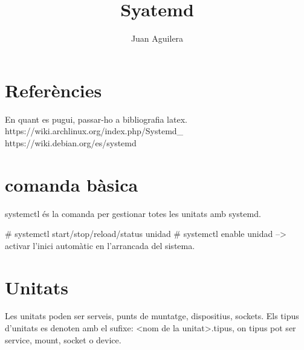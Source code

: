\documentclass[a4paper]{article}
\begin{document}
\title{Syatemd}
\author{Juan Aguilera}
\maketitle

\section{Referències}
En quant es pugui, passar-ho a bibliografia latex.
https://wiki.archlinux.org/index.php/Systemd_%
https://wiki.debian.org/es/systemd

\section{comanda bàsica}
systemctl és la comanda per gestionar totes les unitats amb systemd.

# systemctl start/stop/reload/status unidad
# systemctl enable unidad --> activar l'inici automàtic en l'arrancada del sistema.

\section{Unitats}

Les unitats poden ser serveis, punts de muntatge, dispositius, sockets. Els tipus d'unitats es denoten amb el sufixe: <nom de la unitat>.tipus, on tipus pot ser service, mount, socket o device.
\end{document}

